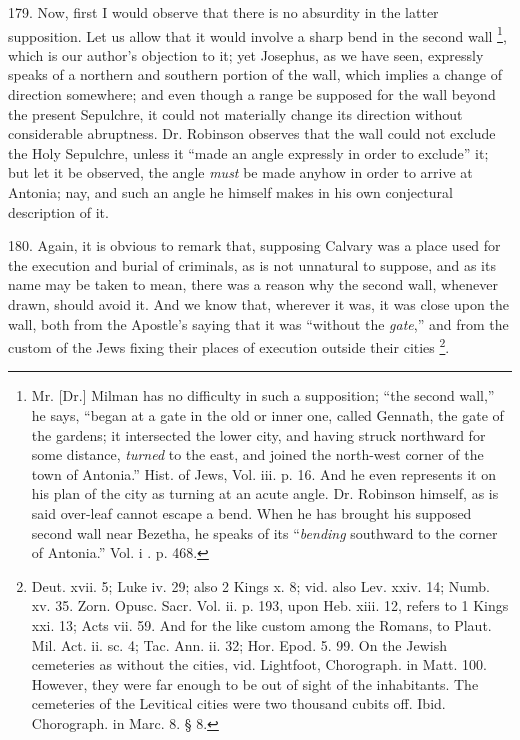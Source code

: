 179.
Now, first I would observe that there is no absurdity in the latter
supposition. Let us allow that it would involve a sharp bend in the
second wall \footnote{Mr. [Dr.] Milman has no difficulty in such a supposition; ``the second
wall,'' he says, ``began at a gate in the old or inner one, called
Gennath, the gate of the gardens; it intersected the lower city, and
having struck northward for some distance, \emph{turned} to the east,
and joined the north-west corner of the town of Antonia.'' Hist. of
Jews, Vol. iii. p. 16. And he even represents it on his plan of the
city as turning at an acute angle. Dr. Robinson himself, as is said
over-leaf cannot escape a bend. When he has brought his supposed
second wall near Bezetha, he speaks of its ``\emph{bending} southward
to the corner of Antonia.'' Vol. i . p. 468.}, which is
our author's objection to it; yet Josephus, as we have seen, expressly
speaks of a northern and southern portion of the wall, which implies a
change of direction somewhere; and even though a range be supposed for
the wall beyond the present Sepulchre, it could not materially change
its direction without considerable abruptness. Dr. Robinson observes
that the wall could not exclude the Holy Sepulchre, unless it ``made
an angle expressly in order to exclude'' it; but let it be observed,
the angle \emph{must} be made anyhow in order to arrive at Antonia;
nay, and such an angle he himself makes in his own conjectural
description of it.

180.
Again, it is obvious to remark that, supposing Calvary was a place
used for the execution and burial of criminals, as is not unnatural to
suppose, and as its name may be taken to mean, there was a reason why
the second wall, whenever drawn, should avoid it. And we know that,
wherever it was, it was close upon the wall, both from the Apostle's
saying that it was ``without the \emph{gate},'' and from the custom
of the Jews fixing their places of execution outside their cities \footnote{Deut. xvii. 5; Luke iv. 29; also 2 Kings x. 8; vid. also Lev. xxiv.
14; Numb. xv. 35. Zorn. Opusc. Sacr. Vol. ii. p. 193, upon Heb. xiii.
12, refers to 1 Kings xxi. 13; Acts vii. 59. And for the like custom
among the Romans, to Plaut. Mil. Act. ii. sc. 4; Tac. Ann. ii. 32; Hor.
Epod. 5. 99. On the Jewish cemeteries as without the cities, vid.
Lightfoot, Chorograph. in Matt. 100. However, they were far enough to
be out of sight of the inhabitants. The cemeteries of the Levitical
cities were two thousand cubits off. Ibid. Chorograph. in Marc. 8. §
8.}.

